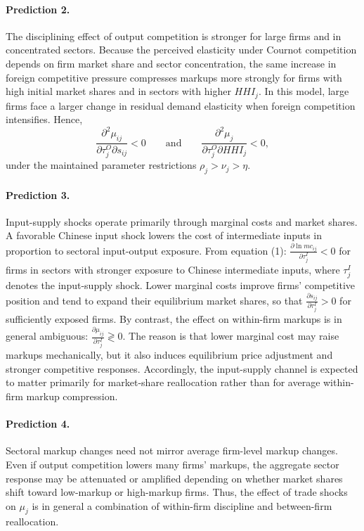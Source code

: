\documentclass[12pt]{article}
\begin{document}
\paragraph{Prediction 2.} The disciplining effect of output competition is stronger for large firms and in concentrated sectors.  
Because the perceived elasticity under Cournot competition depends on firm market share and sector concentration, the same increase in foreign competitive pressure compresses markups more strongly for firms with high initial market shares and in sectors with higher $HHI_j$. In this model, large firms face a larger change in residual demand elasticity when foreign competition intensifies. Hence,
\[
\frac{\partial^2 \mu_{ij}}{\partial \tau_j^O \partial s_{ij}} < 0
\qquad \text{and} \qquad
\frac{\partial^2 \mu_{j}}{\partial \tau_j^O \partial HHI_j} < 0,
\]
under the maintained parameter restrictions $\rho_j > \nu_j > \eta$.

\paragraph{Prediction 3.} Input-supply shocks operate primarily through marginal costs and market shares. A favorable Chinese input shock lowers the cost of intermediate inputs in proportion to sectoral input-output exposure. From equation (1): $\frac{\partial \ln mc_{ij}}{\partial \tau_j^I} < 0$ for firms in sectors with stronger exposure to Chinese intermediate inputs, where $\tau_j^I$ denotes the input-supply shock. Lower marginal costs improve firms' competitive position and tend to expand their equilibrium market shares, so that $\frac{\partial s_{ij}}{\partial \tau_j^I} > 0$ for sufficiently exposed firms. By contrast, the effect on within-firm markups is in general ambiguous: $\frac{\partial \mu_{ij}}{\partial \tau_j^I} \gtrless 0$. The reason is that lower marginal cost may raise markups mechanically, but it also induces equilibrium price adjustment and stronger competitive responses. Accordingly, the input-supply channel is expected to matter primarily for market-share reallocation rather than for average within-firm markup compression.

\paragraph{Prediction 4.} Sectoral markup changes need not mirror average firm-level markup changes. Even if output competition lowers many firms' markups, the aggregate sector response may be attenuated or amplified depending on whether market shares shift toward low-markup or high-markup firms. Thus, the effect of trade shocks on $\mu_j$ is in general a combination of within-firm discipline and between-firm reallocation.
\end{document}
